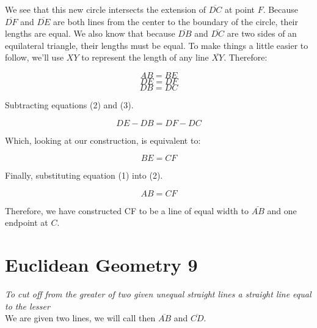 \documentclass[12pt]{article}
\begin{document}
We see that this new circle intersects the extension of $\overline{DC}$ at point $F$. Because $\overline{DF}$ and $\overline{DE}$ are both lines from the center to the boundary of the circle, their lengths are equal. We also know that because $\overline{DB}$ and $\overline{DC}$ are two sides of an equilateral triangle, their lengths must be equal. To make things a little easier to follow, we’ll use $XY$ to represent the length of any line $\overline{XY}$. Therefore:

\begin{equation}
AB = BE
\end{equation}
\begin{equation}
DE = DF
\end{equation}
\begin{equation}
DB = DC
\end{equation}

Subtracting equations (2) and (3).

\[
    DE-DB=DF-DC
\]

Which, looking at our construction, is equivalent to:

\begin{equation}
    BE=CF
\end{equation}

Finally, substituting equation (1) into (2).

\[
AB=CF
\]

Therefore, we have constructed CF to be a line of equal width to $\overline{AB}$ and one endpoint at $C$.

\section{Euclidean Geometry 9}
\textit{To cut off from the greater of two given unequal straight lines a straight line equal to the lesser}
\\

We are given two lines, we will call then $\overline{AB}$ and $\overline{CD}$.

\begin{center}
\end{center}
\end{document}
